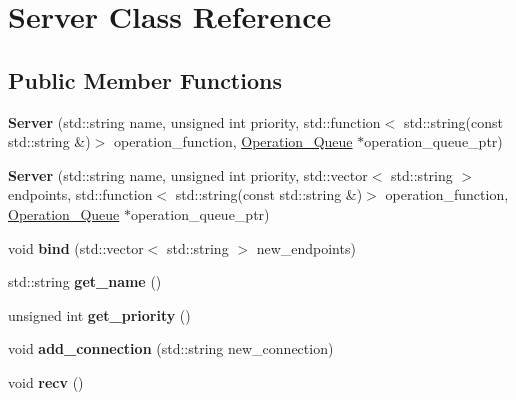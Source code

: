 \hypertarget{classServer}{}\section{Server Class Reference}
\label{classServer}
\subsection*{Public Member Functions}
\begin{DoxyCompactItemize}
\item 
{\bfseries Server} (std\+::string name, unsigned int priority, std\+::function$<$ std\+::string(const std\+::string \&)$>$ operation\+\_\+function, \hyperlink{classOperation__Queue}{Operation\+\_\+\+Queue} $\ast$operation\+\_\+queue\+\_\+ptr)\hypertarget{classServer_a1e77c9c5b6fbc63b023ac083efd8c6ea}{}\label{classServer_a1e77c9c5b6fbc63b023ac083efd8c6ea}

\item 
{\bfseries Server} (std\+::string name, unsigned int priority, std\+::vector$<$ std\+::string $>$ endpoints, std\+::function$<$ std\+::string(const std\+::string \&)$>$ operation\+\_\+function, \hyperlink{classOperation__Queue}{Operation\+\_\+\+Queue} $\ast$operation\+\_\+queue\+\_\+ptr)\hypertarget{classServer_a6c8e865c9e8a488719f10e106abc75be}{}\label{classServer_a6c8e865c9e8a488719f10e106abc75be}

\item 
void {\bfseries bind} (std\+::vector$<$ std\+::string $>$ new\+\_\+endpoints)\hypertarget{classServer_a25286f8ab603f3cd7bd76842f2a8b78d}{}\label{classServer_a25286f8ab603f3cd7bd76842f2a8b78d}

\item 
std\+::string {\bfseries get\+\_\+name} ()\hypertarget{classServer_a09d72bd75643ee43dea39a4753d6df05}{}\label{classServer_a09d72bd75643ee43dea39a4753d6df05}

\item 
unsigned int {\bfseries get\+\_\+priority} ()\hypertarget{classServer_a1c7613df4abf1aaf59b709ad4b3ed8a3}{}\label{classServer_a1c7613df4abf1aaf59b709ad4b3ed8a3}

\item 
void {\bfseries add\+\_\+connection} (std\+::string new\+\_\+connection)\hypertarget{classServer_a71256b14e081575403eefbb6aa6c08bf}{}\label{classServer_a71256b14e081575403eefbb6aa6c08bf}

\item 
void {\bfseries recv} ()\hypertarget{classServer_a6bb73ef31c7ed34fad165435b581d7a9}{}\label{classServer_a6bb73ef31c7ed34fad165435b581d7a9}


\end{DoxyCompactItemize}
